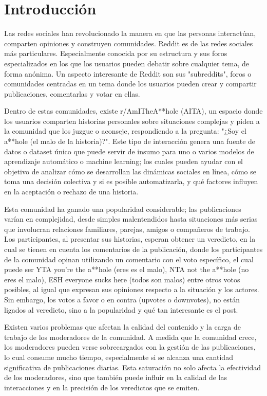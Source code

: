 \section{Introducción}

Las redes sociales han revolucionado la manera en que las personas interactúan, comparten opiniones y construyen comunidades. Reddit es de las redes sociales más particulares. Especialmente conocida por su estructura y sus foros especializados en los que los usuarios pueden debatir sobre cualquier tema, de forma anónima. Un aspecto interesante de Reddit son sus "subreddits", foros o comunidades centradas en un tema donde los usuarios pueden crear y compartir publicaciones, comentarlas y votar en ellas. 

Dentro de estas comunidades, existe r/AmITheA**hole (AITA), un espacio donde los usuarios comparten historias personales sobre situaciones complejas y piden a la comunidad que los juzgue o aconseje, respondiendo a la pregunta: "¿Soy el a**hole (el malo de la historia)?". Este tipo de interacción genera una fuente de datos o dataset único que puede servir de insumo para uno o varios modelos de aprendizaje automático o machine learning; los cuales pueden ayudar con el objetivo de analizar cómo se desarrollan las dinámicas sociales en línea, cómo se toma una decisión colectiva y si es posible automatizarla, y qué factores influyen en la aceptación o rechazo de una historia. 

Esta comunidad ha ganado una popularidad considerable; las publicaciones varían en complejidad, desde simples malentendidos hasta situaciones más serias que involucran relaciones familiares, parejas, amigos o compañeros de trabajo. Los participantes, al presentar sus historias, esperan obtener un veredicto, en la cual se tienen en cuenta los comentarios de la publicación, donde los participantes de la comunidad opinan utilizando un comentario con el voto específico, el cual puede ser YTA you’re the a**hole (eres es el malo), NTA not the a**hole (no eres el malo), ESH everyone sucks here (todos son malos) entre otros votos posibles, al igual que expresan sus opiniones respecto a la situación y los actores. Sin embargo, los votos a favor o en contra (upvotes o downvotes), no están ligados al veredicto, sino a la popularidad y qué tan interesante es el post.

Existen varios problemas que afectan la calidad del contenido y la carga de trabajo de los moderadores de la comunidad. A medida que la comunidad crece, los moderadores pueden verse sobrecargados con la gestión de las publicaciones, lo cual consume mucho tiempo, especialmente si se alcanza una cantidad significativa de publicaciones diarias. Esta saturación no solo afecta la efectividad de los moderadores, sino que también puede influir en la calidad de las interacciones y en la precisión de los veredictos que se emiten.

